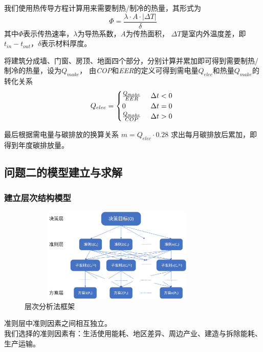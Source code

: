\documentclass[a4paper, 12pt]{article}
\numberwithin{equation}{section}
\begin{document}
            我们使用热传导方程计算用来需要制热/制冷的热量，其形式为
            \begin{equation}
                \Phi = \frac{\lambda \cdot A \cdot |\Delta T|}{\delta}
            \end{equation}
            其中$ \Phi $表示传热速率，$ \lambda $为导热系数，\textit{A}为传热面积，
            $ \Delta T $是室内外温度差，即$ t_{in} - t_{out} $，$ \delta $表示材料厚度。

            将建筑分成墙、门窗、房顶、地面四个部分，分别计算并累加即可得到需要制热/制冷的热量，设为$ Q_{make} $，
            由\textit{COP}和\textit{EER}的定义可得到需电量$ Q_{elec} $和热量$ Q_{make} $的转化关系
            \begin{equation}
                Q_{elec} =
                \begin{cases}
                    \frac{Q_{make}}{EER} & \text{ $ \Delta t < 0 $ } \\
                    0 & \text{ $ \Delta t = 0 $ } \\
                    \frac{Q_{make}}{COP} & \text{ $ \Delta t > 0 $ }
                \end{cases}
            \end{equation}

            最后根据需电量与碳排放的换算关系 $ m = Q_{elec} \cdot 0.28 $ 求出每月碳排放后累加，即得到年度碳排放量。


        \subsection{问题二的模型建立与求解}
            \subsubsection{建立层次结构模型}
                \begin{figure}[h]
                    \centering
                    \includegraphics[height=4.5cm,width=9.5cm]{层次分析法框架.png}
                    \caption{层次分析法框架}
                \end{figure}
                准则层中准则因素之间相互独立。 \\
                我们选择的准则因素有：生活使用能耗、地区差异、周边产业、建造与拆除能耗、生产运输。
\end{document}
